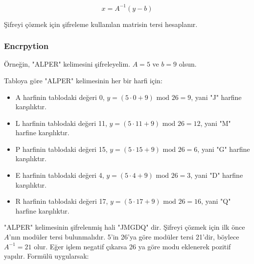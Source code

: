 \[ x = A^{-1} (y - b) \]

Şifreyi çözmek için şifreleme kullanılan matrisin tersi hesaplanır.

\subsubsection{Encrpytion}

Örneğin, "ALPER" kelimesini şifreleyelim. $A = 5$ ve $b = 9$ olsun. 

\begin{table}[ht]
\centering
{}
\end{table}

Tabloya göre "ALPER" kelimesinin her bir harfi için:

\begin{itemize}
    \item A harfinin tablodaki değeri 0, $y = (5 \cdot 0 + 9) \text{ mod } 26 = 9$, yani "J" harfine karşılıktır.
    \item L harfinin tablodaki değeri 11, $y = (5 \cdot 11 + 9) \text{ mod } 26 = 12$, yani "M" harfine karşılıktır.
    \item P harfinin tablodaki değeri 15, $y = (5 \cdot 15 + 9) \text{ mod } 26 = 6$, yani "G" harfine karşılıktır.
    \item E harfinin tablodaki değeri 4, $y = (5 \cdot 4 + 9) \text{ mod } 26 = 3$, yani "D" harfine karşılıktır.
    \item R harfinin tablodaki değeri 17, $y = (5 \cdot 17 + 9) \text{ mod } 26 = 16$, yani "Q" harfine karşılıktır.
\end{itemize}

"ALPER" kelimesinin şifrelenmiş hali "JMGDQ" dir. Şifreyi çözmek için ilk önce $A$'nın modüler tersi bulunmalıdır. 5'in 26'ya göre modüler tersi 21'dir, böylece $A^{-1} = 21$ olur. Eğer işlem negatif çıkarsa 26 ya göre modu eklenerek pozitif yapılır. Formülü uygularsak:

